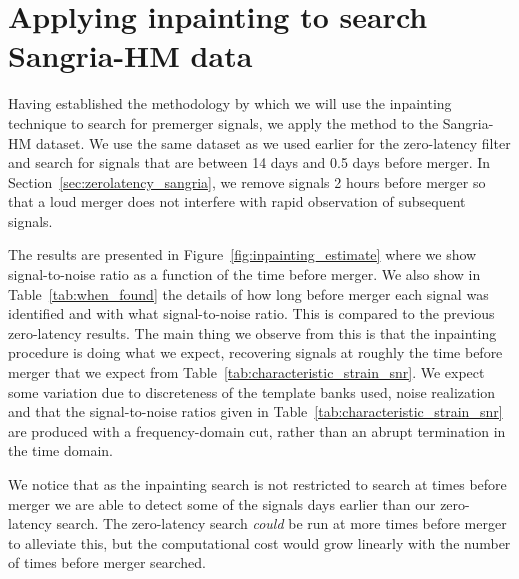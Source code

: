 \section{Applying inpainting to search Sangria-HM data}
\label{sec:inpainting_sangria}


\begin{table}[tbp]
        \centering
        
        \caption{
            Results from the search on Sangria-HM, indicating when signals first cross the signal-to-noise ratio threshold of 10.
            Rows for Signals 2--5 are not shown as the signals overlap.
            We discuss further how we distentangle these signals in Section~\ref{sec:focused}.
        }
        \label{tab:when_found}
\end{table}

Having established the methodology by which we will use the inpainting technique to search for premerger signals, we apply the method to the Sangria-HM dataset.
We use the same dataset as we used earlier for the zero-latency filter and search for signals that are between 14 days and 0.5 days before merger.
In Section~\ref{sec:zerolatency_sangria}, we remove signals 2 hours before merger so that a loud merger does not interfere with rapid observation of subsequent signals.

The results are presented in Figure~\ref{fig:inpainting_estimate} where we show signal-to-noise ratio as a function of the time before merger.
We also show in Table~\ref{tab:when_found} the details of how long before merger each signal was identified and with what signal-to-noise ratio.
This is compared to the previous zero-latency results.
The main thing we observe from this is that the inpainting procedure is doing what we expect, recovering signals at roughly the time before merger that we expect from Table~\ref{tab:characteristic_strain_snr}.
We expect some variation due to discreteness of the template banks used, noise realization and that the signal-to-noise ratios given in Table~\ref{tab:characteristic_strain_snr} are produced with a frequency-domain cut, rather than an abrupt termination in the time domain. 

We notice that as the inpainting search is not restricted to search at  times before merger we are able to detect some of the signals days earlier than our zero-latency search.
The zero-latency search \emph{could} be run at more times before merger to alleviate this, but the computational cost would grow linearly with the number of times before merger searched.

